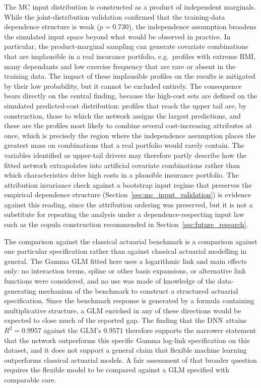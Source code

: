 The MC input distribution is constructed as a product of
independent marginals.  While the joint-distribution validation confirmed
that the training-data dependence structure is weak ($p = 0.730$), the
independence assumption broadens the simulated input space beyond what
would be observed in practice.  In particular, the product-marginal
sampling can generate covariate combinations that are implausible in a
real insurance portfolio, e.g.\ profiles with extreme BMI, many dependants
and low exercise frequency that are rare or absent in the training data.
The impact of these implausible profiles on the results is mitigated by
their low probability, but it cannot be excluded entirely.  The
consequence bears directly on the central finding, because the high-cost
sets are defined on the simulated predicted-cost distribution: profiles
that reach the upper tail are, by construction, those to which the network
assigns the largest predictions, and these are the profiles most likely to
combine several cost-increasing attributes at once, which is precisely the
region where the independence assumption places the greatest mass on
combinations that a real portfolio would rarely contain.  The variables
identified as upper-tail drivers may therefore partly describe how the
fitted network extrapolates into artificial covariate combinations rather
than which characteristics drive high costs in a plausible insurance
portfolio.  The attribution invariance check against a bootstrap input
regime that preserves the empirical dependence structure
(Section~\ref{sec:mc_input_validation}) is evidence against this reading,
since the attribution ordering was preserved, but it is not a substitute
for repeating the analysis under a dependence-respecting input law such as
the copula construction recommended in
Section~\ref{sec:future_research}.

The comparison against the classical actuarial benchmark is a comparison
against one particular specification rather than against classical
actuarial modelling in general.  The Gamma GLM fitted here uses a
logarithmic link and main effects only: no interaction terms, spline or
other basis expansions, or alternative link functions were considered, and
no use was made of knowledge of the data-generating mechanism of the
benchmark to construct a structured actuarial specification.  Since the
benchmark response is generated by a formula containing multiplicative
structure, a GLM enriched in any of these directions would be expected to
close much of the reported gap.  The finding that the DNN attains
$R^2 = 0.9957$ against the GLM's $0.9571$ therefore supports the narrower
statement that the network outperforms this specific Gamma log-link
specification on this dataset, and it does not support a general claim that
flexible machine learning outperforms classical actuarial models.  A fair
assessment of that broader question requires the flexible model to be
compared against a GLM specified with comparable care.

